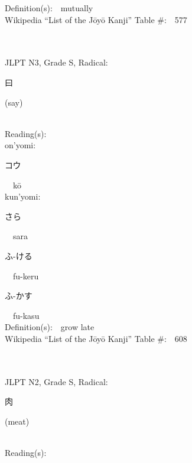 \begin{multicols}{2}
Definition(s):\ \ mutually \\
Wikipedia ``List of the J\=oy\=o Kanji'' Table \#:\ \ 577 \\
\ \ \\
{\fontsize{34pt}{40pt}  }\ \ \\  %
{JLPT N3, Grade S, Radical:\ \ {\begin{CJK}{UTF8}{min} 曰 \end{CJK}} (say) } \\
Reading(s):\ \ \\
{\hspace*{1em}}on'yomi:\ \ \\
{\hspace*{2em}}{\begin{CJK}{UTF8}{min} コウ \end{CJK}}\ \ k\=o\ \ \\
{\hspace*{1em}}kun'yomi:\ \ \\
{\hspace*{2em}}{\begin{CJK}{UTF8}{min} さら \end{CJK}}\ \ sara\ \ \\
{\hspace*{2em}}{\begin{CJK}{UTF8}{min} ふ-ける \end{CJK}}\ \ fu-keru\ \ \\
{\hspace*{2em}}{\begin{CJK}{UTF8}{min} ふ-かす \end{CJK}}\ \ fu-kasu\ \ \\
Definition(s):\ \ grow late \\
Wikipedia ``List of the J\=oy\=o Kanji'' Table \#:\ \ 608 \\
\ \ \\
{\fontsize{34pt}{40pt}  }\ \ \\  %
{JLPT N2, Grade S, Radical:\ \ {\begin{CJK}{UTF8}{min} 肉 \end{CJK}} (meat) } \\
Reading(s):\ \ \\

\end{multicols}
